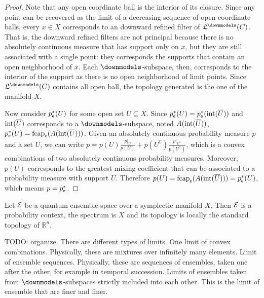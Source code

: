 \begin{proof}
	Note that any open coordinate ball is the interior of its closure. Since any point can be recovered as the limit of a decreasing sequence of open coordinate balls, every $x \in X$ corresponds to an downward refined filter of $\mathfrak{L}^\separate(C)$. That is, the downward refined filters are not principal because there is no absolutely continuous measure that has support only on $x$, but they are still associated with a single point: they corresponds the supports that contain an open neighborhood of $x$. Each $\separate$-subspace, then, corresponds to the interior of the support as there is no open neighborhood of limit points. Since $\mathfrak{L}^\separate(C)$ contains all open ball, the topology generated is the one of the manifold $X$.
	
	Now consider $p^*_{\mathsf{e}}(U)$ for some open set $U \subseteq X$. Since $p^*_{\mathsf{e}}(U) = p^*_{\mathsf{e}}(\operatorname{int}(\overline{U}))$ and $\operatorname{int}(\overline{U})$ corresponds to a $\separate$-subspace, noted $A(\operatorname{int}(\overline{U}))$, $p^*_{\mathsf{e}}(U) = \mathrm{fcap}_{\mathsf{e}}(A(\operatorname{int}(\overline{U})))$. Given an absolutely continuous probability measure $p$ and a set $U$, we can write $p = p(U) \frac{\left.p\right|_{U}}{p(U)} + p(U^{\complement}) \frac{\left.p\right|_{U^{\complement}}}{p(U^{\complement})}$, which is a convex combinations of two absolutely continuous probability measures. Moreover, $p(U)$ corresponds to the greatest mixing coefficient that can be associated to a probability measure with support $U$. Therefore $p(U) = \mathrm{fcap}_{\mathsf{e}}(A(\operatorname{int}(\overline{U}))) = p^*_{\mathsf{e}}(U)$, which means $p = p^*_{\mathsf{e}}$.
\end{proof}

\begin{prop}
	Let $\mathcal{E}$ be a quantum ensemble space over a symplectic manifold $X$. Then $\mathcal{E}$ is a probability context, the spectrum is $X$ and its topology is locally the standard topology of $\mathbb{R}^n$.
\end{prop}


\begin{remark}
	TODO: organize. There are different types of limits. One limit of convex combinations. Physically, these are mixtures over infinitely many elements. Limit of ensemble sequences. Physically, these are sequences of ensembles, taken one after the other, for example in temporal succession. Limits of ensembles taken from $\separate$-subspaces strictly included into each other. This is the limit of ensemble that are finer and finer.
\end{remark}

